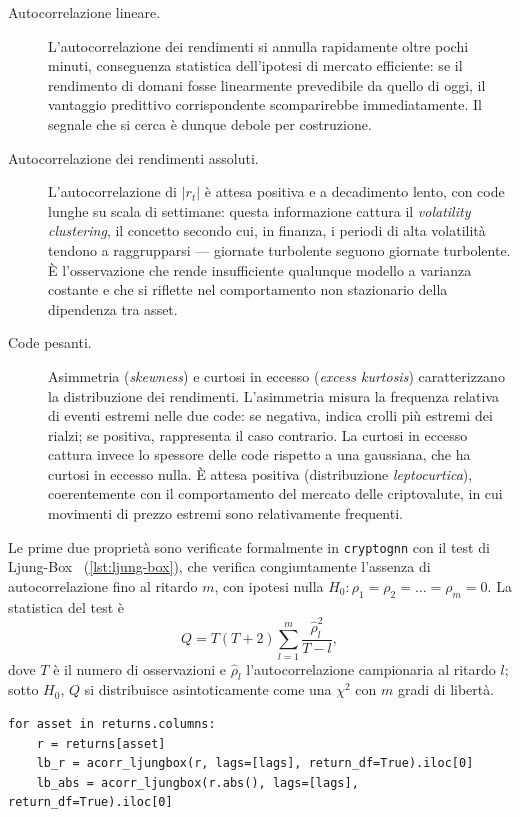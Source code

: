 \begin{description}
    \item[Autocorrelazione lineare.] L'autocorrelazione dei rendimenti si annulla rapidamente oltre pochi minuti, conseguenza statistica dell'ipotesi di mercato efficiente: se il rendimento di domani fosse linearmente prevedibile da quello di oggi, il vantaggio predittivo corrispondente scomparirebbe immediatamente. Il segnale che si cerca è dunque debole per costruzione.
    \item[Autocorrelazione dei rendimenti assoluti.] L'autocorrelazione di $|r_t|$ è attesa positiva e a decadimento lento, con code lunghe su scala di settimane: questa informazione cattura il \emph{volatility clustering}, il concetto secondo cui, in finanza, i periodi di alta volatilità tendono a raggrupparsi — giornate turbolente seguono giornate turbolente. È l'osservazione che rende insufficiente qualunque modello a varianza costante e che si riflette nel comportamento non stazionario della dipendenza tra asset.
    \item[Code pesanti.] Asimmetria (\emph{skewness}) e curtosi in eccesso (\emph{excess kurtosis}) caratterizzano la distribuzione dei rendimenti. L'asimmetria misura la frequenza relativa di eventi estremi nelle due code: se negativa, indica crolli più estremi dei rialzi; se positiva, rappresenta il caso contrario. La curtosi in eccesso cattura invece lo spessore delle code rispetto a una gaussiana, che ha curtosi in eccesso nulla. È attesa positiva (distribuzione \emph{leptocurtica}), coerentemente con il comportamento del mercato delle criptovalute, in cui movimenti di prezzo estremi sono relativamente frequenti.
\end{description}

Le prime due proprietà sono verificate formalmente in \texttt{cryptognn} con il test di Ljung-Box~\cite{ljungbox1978measure} (\cref{lst:ljung-box}), che verifica congiuntamente l'assenza di autocorrelazione fino al ritardo $m$, con ipotesi nulla $H_0: \rho_1=\rho_2=\dots=\rho_m=0$. La statistica del test è
\begin{equation}
\label{eq:ljung-box}
Q = T(T+2)\sum_{l=1}^{m}\frac{\hat\rho_l^2}{T-l},
\end{equation}
dove $T$ è il numero di osservazioni e $\hat\rho_l$ l'autocorrelazione campionaria al ritardo $l$; sotto $H_0$, $Q$ si distribuisce asintoticamente come una $\chi^2$ con $m$ gradi di libertà.

\begin{listing}[H]
\begin{verbatim}
for asset in returns.columns:
    r = returns[asset]
    lb_r = acorr_ljungbox(r, lags=[lags], return_df=True).iloc[0]
    lb_abs = acorr_ljungbox(r.abs(), lags=[lags], return_df=True).iloc[0]
\end{verbatim}
\caption{\texttt{compute\_ljung\_box}}
\label{lst:ljung-box}
\end{listing}

